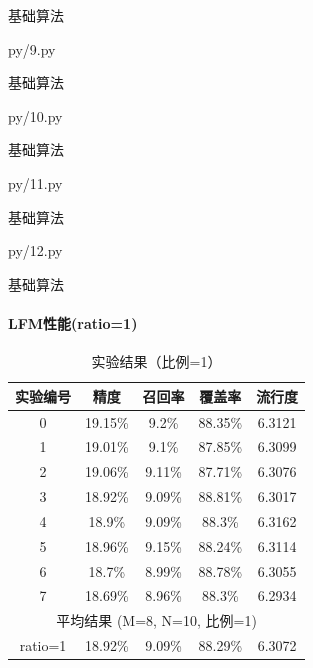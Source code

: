 \documentclass{beamer}
\begin{document}
	\begin{frame}{基础算法}
			
							{py/9.py}
	\end{frame}
	\begin{frame}{基础算法}
			
							{py/10.py}
	\end{frame}
	\begin{frame}{基础算法}
			
							{py/11.py}
	\end{frame}
	\begin{frame}{基础算法}
			
							{py/12.py}
	\end{frame}
	\begin{frame}{基础算法}
	\framesubtitle{LFM性能(ratio=1)}
		\begin{table}[h]
		\centering
		\caption{实验结果（比例=1）}
			\begin{tabular}{|c|c|c|c|c|}
			\hline
			实验编号 & 精度 & 召回率 & 覆盖率 & 流行度 \\
			\hline
			0 & 19.15\% & 9.2\% & 88.35\% & 6.3121 \\
			1 & 19.01\% & 9.1\% & 87.85\% & 6.3099 \\
			2 & 19.06\% & 9.11\% & 87.71\% & 6.3076 \\
			3 & 18.92\% & 9.09\% & 88.81\% & 6.3017 \\
			4 & 18.9\% & 9.09\% & 88.3\% & 6.3162 \\
			5 & 18.96\% & 9.15\% & 88.24\% & 6.3114 \\
			6 & 18.7\% & 8.99\% & 88.78\% & 6.3055 \\
			7 & 18.69\% & 8.96\% & 88.3\% & 6.2934 \\
			\hline
			\multicolumn{5}{c}{平均结果 (M=8, N=10, 比例=1)} \\
			\hline
 			ratio=1 & 18.92\% & 9.09\% & 88.29\% & 6.3072 \\
			\hline
			\end{tabular}
		\end{table}
	\end{frame}
\end{document}
